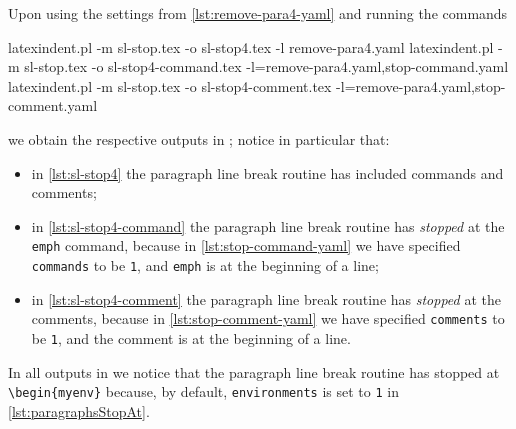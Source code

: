 	Upon using the settings from \vref{lst:remove-para4-yaml} and running the commands
	\begin{widepage}
		\begin{commandshell}
latexindent.pl -m sl-stop.tex -o sl-stop4.tex -l remove-para4.yaml
latexindent.pl -m sl-stop.tex -o sl-stop4-command.tex -l=remove-para4.yaml,stop-command.yaml
latexindent.pl -m sl-stop.tex -o sl-stop4-comment.tex -l=remove-para4.yaml,stop-comment.yaml
    \end{commandshell}
	\end{widepage}
	we obtain the respective outputs in ; notice in particular that:
	\begin{itemize}
		\item in \cref{lst:sl-stop4} the paragraph line break routine has included commands and comments;
		\item in \cref{lst:sl-stop4-command} the paragraph line break routine has \emph{stopped} at the
		      \texttt{emph} command, because in \cref{lst:stop-command-yaml} we have specified \texttt{commands}
		      to be \texttt{1}, and \texttt{emph} is at the beginning of a line;
		\item in \cref{lst:sl-stop4-comment} the paragraph line break routine has \emph{stopped}
		      at the comments, because in \cref{lst:stop-comment-yaml} we have specified \texttt{comments}
		      to be \texttt{1}, and the comment is at the beginning of a line.
	\end{itemize}
	In all outputs in  we notice that the paragraph line break
	routine has stopped at \lstinline!\begin{myenv}! because, by default, \texttt{environments}
	is set to \texttt{1} in \vref{lst:paragraphsStopAt}.


